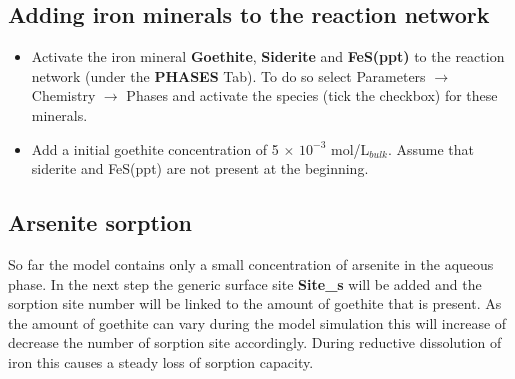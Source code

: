 \subsection[Adding iron minerals to the reaction network]{Adding iron minerals to the reaction network} 

\begin{itemize}
\item Activate the iron mineral {\color{red} \textbf{Goethite}}, {\color{red} \textbf{Siderite}} 
and {\color{red} \textbf{FeS(ppt)}} to the reaction network (under the {\color{red} \textbf{PHASES}} Tab).
To do so select Parameters $\rightarrow$ Chemistry $\rightarrow$ Phases and 
activate the species (tick the checkbox) for these minerals. 

\item Add a initial goethite concentration of 5 $\times$ $10^{-3}$ mol/L$_{bulk}$. Assume that siderite and FeS(ppt) are not present at the beginning. 

\end{itemize}

\subsection[Arsenite sorption]{Arsenite sorption} 

So far the model contains only a small concentration of arsenite in the aqueous phase. 
In the next step the generic surface site {\color{red} \textbf{Site\_s}} will be added and the
sorption site number will be linked to the amount of goethite that is present. As the amount of goethite can vary during the model simulation this will increase of decrease the number of sorption site accordingly. 
During reductive dissolution of iron this causes a steady loss of sorption capacity.   

